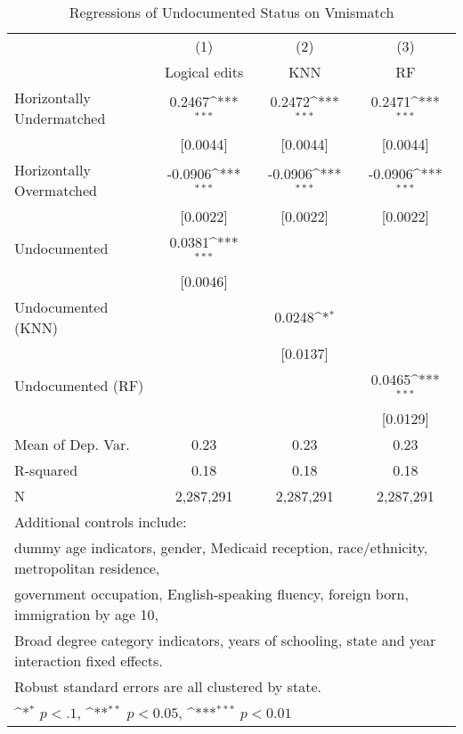 \begin{table}[htbp]\centering
\def\sym#1{\ifmmode^{#1}\else\(^{#1}\)\fi}
\caption{Regressions of Undocumented Status on Vmismatch}
\begin{tabular}{l*{3}{c}}
\toprule
                    &\multicolumn{1}{c}{(1)}         &\multicolumn{1}{c}{(2)}         &\multicolumn{1}{c}{(3)}         \\
                    &Logical edits         &         KNN         &          RF         \\
\midrule
Horizontally Undermatched&      0.2467\sym{***}&      0.2472\sym{***}&      0.2471\sym{***}\\
                    &    [0.0044]         &    [0.0044]         &    [0.0044]         \\
\addlinespace
Horizontally Overmatched&     -0.0906\sym{***}&     -0.0906\sym{***}&     -0.0906\sym{***}\\
                    &    [0.0022]         &    [0.0022]         &    [0.0022]         \\
\addlinespace
Undocumented        &      0.0381\sym{***}&                     &                     \\
                    &    [0.0046]         &                     &                     \\
\addlinespace
Undocumented (KNN)  &                     &      0.0248\sym{*}  &                     \\
                    &                     &    [0.0137]         &                     \\
\addlinespace
Undocumented (RF)   &                     &                     &      0.0465\sym{***}\\
                    &                     &                     &    [0.0129]         \\
\midrule
Mean of Dep. Var.   &        0.23         &        0.23         &        0.23         \\
R-squared           &        0.18         &        0.18         &        0.18         \\
N                   &   2,287,291         &   2,287,291         &   2,287,291         \\
\bottomrule
\multicolumn{4}{l}{\footnotesize Additional controls include:}\\
\multicolumn{4}{l}{\footnotesize dummy age indicators, gender, Medicaid reception, race/ethnicity, metropolitan residence,}\\
\multicolumn{4}{l}{\footnotesize government occupation, English-speaking fluency, foreign born, immigration by age 10,}\\
\multicolumn{4}{l}{\footnotesize Broad degree category indicators, years of schooling, state and year interaction fixed effects.}\\
\multicolumn{4}{l}{\footnotesize Robust standard errors are all clustered by state.}\\
\multicolumn{4}{l}{\footnotesize \sym{*} \(p<.1\), \sym{**} \(p<0.05\), \sym{***} \(p<0.01\)}\\
\end{tabular}
\end{table}
